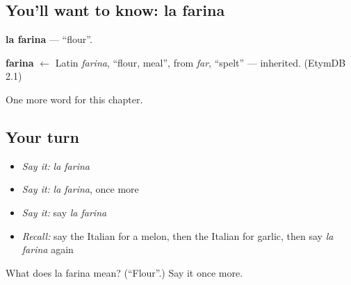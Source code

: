 \subsection*{You'll want to know: la farina}
\textbf{la farina} — \textquotedblleft{}flour\textquotedblright{}.

\begin{cousinweb}
\textbf{farina} $\leftarrow$ Latin \emph{farina}, \textquotedblleft{}flour, meal\textquotedblright{}, from \emph{far}, \textquotedblleft{}spelt\textquotedblright{} — inherited. (EtymDB 2.1)
\end{cousinweb}

\begin{grammarlens}[title={What you've built}]
One more word for this chapter.
\end{grammarlens}

\subsection*{Your turn}
\begin{itemize}
\raggedright
  \item \emph{Say it:} \emph{la farina}
  \item \emph{Say it:} \emph{la farina}, once more
  \item \emph{Say it:} say \emph{la farina}
  \item \emph{Recall:} say the Italian for a melon, then the Italian for garlic, then say \emph{la farina} again
\end{itemize}

\begin{tcolorbox}[breakable,colback=teal!4,colframe=teal!35!black,title={Before you move on}]
What does la farina mean? (\textquotedblleft{}Flour\textquotedblright{}.) Say it once more.
\end{tcolorbox}
